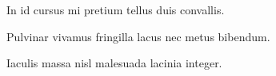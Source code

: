 
\begin{tcolorbox}[
    colback=yellow!30,    %
    colframe=black,       %
    sharp corners,        %
    boxrule=0.5pt,        %
    left=2mm, 
    right=2mm, 
    top=2mm, 
    bottom=5pt, 
    width=0.98\linewidth  %
]
    \newfinding In id cursus mi pretium tellus duis convallis.
    
    \newfinding Pulvinar vivamus fringilla lacus nec metus bibendum.
    
    \newfinding Iaculis massa nisl malesuada lacinia integer.
    \label{finding: template-finding}
\end{tcolorbox}